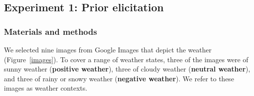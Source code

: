\documentclass[10pt,letterpaper]{article}
\begin{document}



\subsection{Experiment 1: Prior elicitation}
\subsubsection{Materials and methods}
We selected nine images from Google Images that depict the weather (Figure~\ref{images}). To cover a range of weather states, three of the images were of sunny weather (\textbf{positive weather}), three of cloudy weather (\textbf{neutral weather}), and three of rainy or snowy weather (\textbf{negative weather}). We refer to these images as weather contexts.


%
\end{document}
